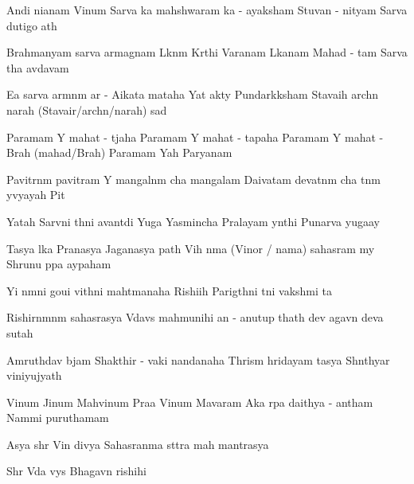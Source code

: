 \documentclass[20pt]{article}
\begin{document}
\SlokaHuge
{An{\aaa}di ni{\dhh}anam Vi{\sh}num} {Sarva {\lo}ka mah{\e}shwaram}
{{\Lo}ka - a{\dhh}yaksham Stuvan - nityam} {Sarva du{\kh}{\A}tigo {\bh}a{\ve}th}

\SlokaHuge
{Brahmanyam sarva {\Dh}armagnam} {L{\oh}k{\A}n{\A}m K{\ee}rthi Var{\dhh}anam}
{L{\oh}kan{\A}{\Th}am Mahad - {\bh}{\oo}tam} {Sarva {\Bh}{\oo}tha {\bh}av{\oh}d{\bh}avam}

\SlokaHuge
{E{\sh}a {\me} sarva {\Dh}arm{\A}n{\A}m} {{\Dh}ar{\mo} - A{\dhh}ikata{\mo} mataha}
{Yat \dsh {\bh}akty{\A} Pundar{\ee}k{\A}ksham} {Stavaih arch{\e}n narah (Stavair/arch{\e}n/narah) sad{\A}}

\novspace
\SlokaHuge
{Paramam Y{\oh} mahat - t{\e}jaha} {Paramam Y{\oh} mahat - tapaha}
{Paramam Y{\oh} mahat - Brah{\ma} (mahad/Brah{\ma})} {Paramam Yah Par{\A}yanam}

\SlokaHuge
{Pavitr{\A}n{\A}m pavitram Y{\oh}} {mangal{\A}n{\A}m cha mangalam}
{Daivatam devat{\A}n{\A}m cha} {{\Bh}{\oo}t{\A}n{\A}m y{\oh}vyayah Pit{\A}}

\SlokaHuge
{Yatah Sarv{\A}ni {\Bh}{\oo}th{\A}ni} {{\Bh}avant{\ya}di Yu{\ga}ga{\me}}
{Yasmin{\sh}cha Pralayam y{\A}nthi} {Punar{\e}va yuga{\ksh}ay{\e}}

\SlokaHuge
{Tasya l{\oh}ka Pra{\dhh}{\A}nasya} {Jagan{\na}{\Th}asya {\Bh}{\oo}path{\e}}
{Vi{\sh}{\no}h \dsh n{\A}ma (Vi{\sh}nor / nama) sahasram m{\e}y} {Shrunu p{\A}pa {\bh}ay{\A}paham}

\novspace
\SlokaHuge
{Y{\an}i n{\A}m{\A}ni goui} {vi{\kh}{\ya}th{\A}ni mah{\A}tmanaha}
{Rishi{\bh}ih Parig{\ee}th{\A}ni} {t{\ha}ni vaksh{\ya}mi {\Bh}{\oo}ta{\ye}}

\SlokaHuge
{Rishirn{\A}mn{\A}m sahasrasya} {V{\e}dav{\ya}s{\oh} mah{\A}munihi}
{{\Ch}an{\dO} - anu{\sh}tup thath{\A} dev{\oh}} {{\Bh}agav{\A}n deva{\ki} sutah}

\SlokaHuge
{Amruth{\am}{\sh}{\oo}d{\bh}av{\oh} b{\ee}jam} {Shakthir - {\De}vaki nandanaha}
{Thris{\A}m{\A} hridayam tasya} {Sh{\aaa}nthyar{\tHe} viniyujyath{\e}}

\SlokaHuge
{Vi{\sh}num Ji{\sh}num Mah{\A}vi{\sh}num} {Pra{\bh}a Vi{\sh}num Ma{\he}{\sh}varam}
{A{\nE}ka r{\oo}pa daithya - antham} {Nam{\A}mi puru{\sho}thamam}

\resetcountr
\novspace
{}

\SlokaHuge
{Asya shr{\ee} Vi{\sh}n{\oh} divya}
{Sahasran{\aaa}ma st{\oh}tra}
{mah{\A} mantrasya}

\SlokaHuge
{Shr{\ee} V{\e}da vy{\A}s{\oh}}
{Bhagav{\A}n rishihi}
\end{document}
